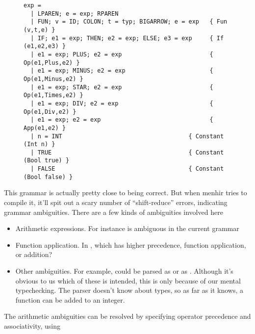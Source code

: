 \documentclass[pageno]{jpaper}
\begin{document}
{{\begin{figure}
\begin{lstlisting}
exp =
  | LPAREN; e = exp; RPAREN
  | FUN; v = ID; COLON; t = typ; BIGARROW; e = exp   { Fun (v,t,e) }
  | IF; e1 = exp; THEN; e2 = exp; ELSE; e3 = exp     { If (e1,e2,e3) }
  | e1 = exp; PLUS; e2 = exp                         { Op(e1,Plus,e2) }
  | e1 = exp; MINUS; e2 = exp                        { Op(e1,Minus,e2) }
  | e1 = exp; STAR; e2 = exp                         { Op(e1,Times,e2) }
  | e1 = exp; DIV; e2 = exp                          { Op(e1,Div,e2) }
  | e1 = exp; e2 = exp                               { App(e1,e2) }
  | n = INT                                    { Constant (Int n) }
  | TRUE                                       { Constant (Bool true) }
  | FALSE                                      { Constant (Bool false) }

\end{lstlisting}
\end{figure}
\FloatBarrier

This grammar is actually pretty close to being correct. But when menhir tries to compile it, it'll spit out
a scary number of ``shift-reduce'' errors, indicating grammar ambiguities.
There are a few kinds of ambiguities involved here
\begin{itemize}
\item Arithmetic expressions. For instance  is ambiguous in the current grammar
\item Function application. In , which has higher precedence, function
      application, or addition?
\item Other ambiguities.  For example,  could be parsed as
       or as .  Although it's obvious to us
      which of these is intended, this is only because of our mental typechecking.  The parser doesn't know
      about types, so as far as it knows, a function can be added to an integer.
\end{itemize}
The arithmetic ambiguities
can be resolved by specifying operator precedence and associativity, using \lsti{%

The other shift-reduce errors, as far as I know, cannot be fixed with precedence and associativity annotations
in menhir.  Instead, we have to add a few auxiliary nonterminal symbols.  We can do it like so:

\FloatBarrier
\begin{figure}
\begin{lstlisting}


\end{lstlisting}
\end{figure}}}}
\end{document}
